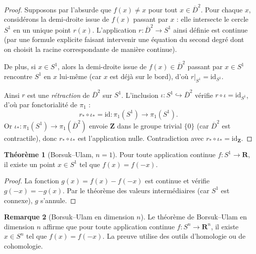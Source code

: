 \documentclass[12pt,a4paper,openany]{book}
\theoremstyle{definition}
\theoremstyle{cours}
\newtheorem{theoreme}{Théorème}[chapter]
\theoremstyle{coursnormal}
\newtheorem{remarque}[theoreme]{Remarque}
\begin{document}
\begin{proof}
Supposons par l'absurde que $f(x)\neq x$ pour tout
$x\in\overline{D}^2$. Pour chaque $x$, considérons la demi-droite
issue de $f(x)$ passant par $x$ : elle intersecte le cercle $S^1$ en
un unique point $r(x)$. L'application $r\colon\overline{D}^2\to S^1$
ainsi définie est continue (par une formule explicite faisant
intervenir une équation du second degré dont on choisit la racine
correspondante de manière continue).

De plus, si $x\in S^1$, alors la demi-droite issue de $f(x)\in
\overline{D}^2$ passant par $x\in S^1$ rencontre $S^1$ en $x$ lui-même
(car $x$ est déjà sur le bord), d'où $r|_{S^1}=\mathrm{id}_{S^1}$.

Ainsi $r$ est une \emph{rétraction} de
$\overline{D}^2$ sur $S^1$. L'inclusion $\iota\colon S^1\hookrightarrow
\overline{D}^2$ vérifie $r\circ\iota=\mathrm{id}_{S^1}$, d'où par
fonctorialité de $\pi_1$ :
\[
r_*\circ\iota_* = \mathrm{id}\colon
\pi_1(S^1)\to\pi_1(S^1).
\]
Or $\iota_*\colon\pi_1(S^1)\to\pi_1(\overline{D}^2)$ envoie
$\mathbf{Z}$ dans le groupe trivial $\{0\}$ (car $\overline{D}^2$
est contractile), donc $r_*\circ\iota_*$ est l'application nulle.
Contradiction avec $r_*\circ\iota_*=\mathrm{id}_{\mathbf{Z}}$.
\end{proof}

\begin{theoreme}[Borsuk--Ulam, $n=1$]
\label{thm:borsuk-ulam-1}
Pour toute application continue $f\colon S^1\to\mathbf{R}$, il existe
un point $x\in S^1$ tel que $f(x)=f(-x)$.
\end{theoreme}

\begin{proof}
La fonction $g(x)=f(x)-f(-x)$ est continue et vérifie $g(-x)=-g(x)$.
Par le théorème des valeurs intermédiaires (car $S^1$ est connexe),
$g$ s'annule.
\end{proof}

\begin{remarque}[Borsuk--Ulam en dimension $n$]
\label{rem:borsuk-ulam-n}
Le théorème de Borsuk--Ulam en dimension $n$ affirme que pour toute
application continue $f\colon S^n\to\mathbf{R}^n$, il existe $x\in S^n$
tel que $f(x)=f(-x)$. La preuve utilise des outils d'homologie ou de
cohomologie.
\end{remarque}

\end{document}
